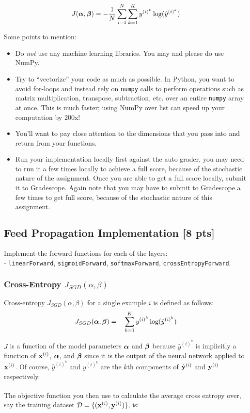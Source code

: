 \begin{align*}
J(\boldsymbol \alpha, \boldsymbol \beta)= - \frac{1}{N} \sum_{i=1}^N \sum_{k=1}^{K} y^{(i)^k} \log (\hat{y}^{(i)^k})
\end{align*}

Some points to mention:
\begin{itemize}
\item Do \emph{not} use any machine learning libraries. You may and please do use NumPy.
\item Try to ``vectorize'' your code as much as possible. In Python, you want to avoid for-loops and instead rely on \lstinline{numpy} calls to perform operations such as matrix multiplication, transpose, subtraction, etc. over an entire \lstinline{numpy} array at once. This is much faster; using NumPy over list can speed up your computation by 200x!
\item You'll want to pay close attention to the dimensions that you pass into and return from your functions.
\item Run your implementation locally first against the auto grader, you may need to run it a few times locally to achieve a full score, because of the stochastic nature of the assignment. Once you are able to get a full score locally, submit it to Gradescope. Again note that you may have to submit to Gradescope a few times to get full score, because of the stochastic nature of this assignment.
\end{itemize}
\subsection{Feed Propagation Implementation [8 pts]}
Implement the forward functions for each of the layers: \\ - \texttt{linearForward}, \texttt{sigmoidForward}, \texttt{softmaxForward}, \texttt{crossEntropyForward}. 
\subsubsection{Cross-Entropy $J_{SGD}(\alpha,\beta)$}
Cross-entropy $J_{SGD}(\alpha, \beta)$ for a single example $i$ is defined as follows:
\begin{equation}
\label{eq:celoss2}
J_{SGD}(\boldsymbol \alpha, \boldsymbol \beta)= - \sum_{k=1}^{K} y^{(i)^k} \log (\hat{y}^{(i)^k})
\end{equation}

$J$ is a function of the model parameters $\boldsymbol \alpha$ and $\boldsymbol \beta$ because $\hat{y}^{(i)}^k$ is implicitly a function of $\mathbf{x}^{(i)}$, $\boldsymbol \alpha$, and $\boldsymbol \beta$ since it is the output of the neural network applied to $\mathbf{x}^{(i)}$. Of course, $\hat{y}^{(i)^k}$ and $y^{(i)^k}$ are the $k$th components of $\hat{\mathbf{y}}^{(i)}$ and $\mathbf{y}^{(i)}$ respectively.
\\\\ The objective function you then use to calculate the average cross entropy over, say the training dataset $\mathcal{D} = \{ (\mathbf{x}^{(i)}, \mathbf{y}^{(i)}) \}$, is:

